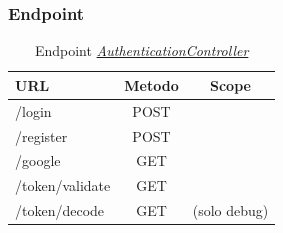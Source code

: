 \subsubsection{Endpoint}

\label{server:auth-controller}
\begin{table}[H]
	\ttfamily
	\caption{Endpoint \hyperref[server:auth-controller]{\textit{AuthenticationController}}}
	\centering
	\label{table:api:auth-controller}
	\begin{tabular}{l c c}    
		URL  & Metodo & Scope \\ 
		\midrule
		/login & POST &  \\
		/register & POST &  \\
		/google & GET &  \\
		/token/validate & GET  &  \\
		/token/decode & GET  & (solo debug)  \\
		\bottomrule
	\end{tabular}
\end{table}
